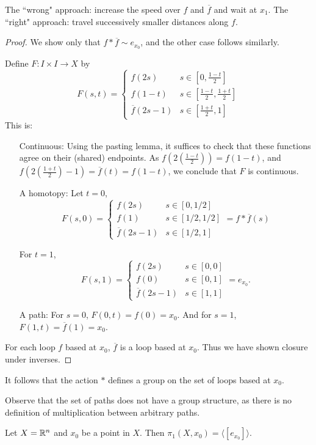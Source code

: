The ``wrong" approach: increase the speed over $f$ and $\overline{f}$ and wait at $x_1$. The ``right" approach: travel successively smaller distances along $f$. 
\begin{proof}
	We show only that $f*\overline{f}\sim e_{x_0}$, and the other case follows similarly.
	
	Define $F:I\times I\to X$ by
	\[ F(s,t)= 
	\begin{cases}
		f(2s) & s\in \left[0,\tfrac{1-t}{2}\right] \\
		f(1-t) & s\in \left[\tfrac{1-t}{2},\tfrac{1+t}{2}\right]\\
		\overline{f}(2s-1) & s\in\left[\tfrac{1+t}{2}, 1\right] 
	\end{cases}
	\]
	This is: 
	\begin{itemize}
		\item[Continuous:] Using the pasting lemma, it suffices to check that these functions agree on their (shared) endpoints. As $f(2(\tfrac{1-t}{2}))=f(1-t)$, and $f(2(\tfrac{1+t}{2})-1)=\overline{f}(t)=f(1-t)$, we conclude that $F$ is continuous.
		
		\item[A homotopy:] Let $t=0$,
		\[F(s,0)= 
		\begin{cases}
			f(2s) & s\in [0,1/2]\\
			f(1) & s\in [1/2,1/2] \\
			\overline{f}(2s-1) & s\in [1/2,1] 
		\end{cases}
		=f*\overline{f}(s)\]
		
		For $t=1$,
		\[F(s,1)= 
		\begin{cases}
			f(2s) & s\in [0,0]\\
			f(0) & s\in [0,1]\\
			\overline{f}(2s-1) & s\in [1,1] 
		\end{cases}
		=e_{x_0}.\]
		
		\item[A path:] For $s=0$, $F(0,t)=f(0)=x_0$. And for $s=1$, $F(1,t)=\overline{f}(1)=x_0$. 
	\end{itemize}
	
	For each loop $f$ based at $x_0$, $\overline{f}$ is a loop based at $x_0$. Thus we have shown closure under inverses. 
\end{proof}

It follows that the action $*$ defines a group on the set of loops based at $x_0$.

Observe that the set of paths does not have a group structure, as there is no definition of multiplication between arbitrary paths. 
\begin{example}
	Let $X=\mathbb R^n$ and $x_0$ be a point in $X$. Then $\pi_1(X,x_0)=\langle [e_{x_0}]\rangle$. 
\end{example}

